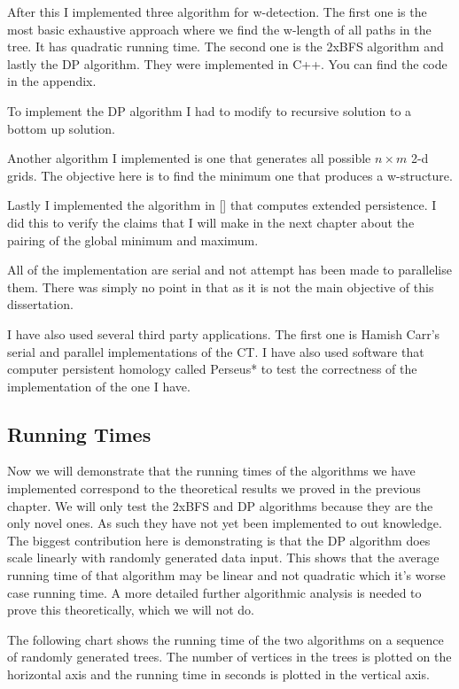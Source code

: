 After this I implemented three algorithm for w-detection. The first one is the most basic exhaustive approach where we find the w-length of all paths in the tree. It has quadratic running time. The second one is the 2xBFS algorithm and lastly the DP algorithm. They were implemented in C++. You can find the code in the appendix.


To implement the DP algorithm I had to modify to recursive solution to a bottom up solution.

Another algorithm I implemented is one that generates all possible $n \times m$ 2-d grids. The objective here is to find the minimum one that produces a w-structure.

Lastly I implemented the algorithm in [] that computes extended persistence. I did this to verify the claims that I will make in the next chapter about the pairing of the global minimum and maximum.

All of the implementation are serial and not attempt has been made to parallelise them. There was simply no point in that as it is not the main objective of this dissertation.

I have also used several third party applications. The first one is Hamish Carr's serial and parallel implementations of the CT. I have also used software that computer persistent homology called Perseus* to test the correctness of the implementation of the one I have.


\subsection{Running Times}


Now we will demonstrate that the running times of the algorithms we have implemented correspond to the theoretical results we proved in the previous chapter. We will only test the 2xBFS and DP algorithms because they are the only novel ones. As such they have not yet been implemented to out knowledge. The biggest contribution here is demonstrating is that the DP algorithm does scale linearly with randomly generated data input. This shows that the average running time of that algorithm may be linear and not quadratic which it's worse case running time. A more detailed further algorithmic analysis is needed to prove this theoretically, which we will not do.

The following chart shows the running time of the two algorithms on a sequence of randomly generated trees. The number of vertices in the trees is plotted on the horizontal axis and the running time in seconds is plotted in the vertical axis.

